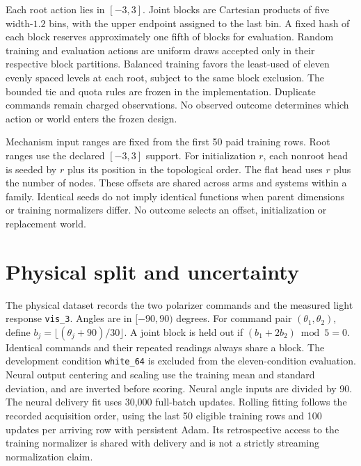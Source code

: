 Each root action lies in $[-3,3]$. Joint blocks are Cartesian products of five
width-$1.2$ bins, with the upper endpoint assigned to the last bin. A fixed hash
of each block reserves approximately one fifth of blocks for evaluation.
Random training and evaluation actions are uniform draws accepted only in
their respective block partitions. Balanced training favors the least-used
of eleven evenly spaced levels at each root, subject to the same block
exclusion. The bounded tie and quota rules are frozen in the implementation.
Duplicate commands remain charged observations. No observed outcome determines
which action or world enters the frozen design.

Mechanism input ranges are fixed from the first 50 paid training rows.
Root ranges use the declared $[-3,3]$ support. For initialization $r$, each
nonroot head is seeded by $r$ plus its position in the topological order. The
flat head uses $r$ plus the number of nodes. These offsets are shared across arms and systems within a family.
Identical seeds do not imply identical functions when parent dimensions or
training normalizers differ. No outcome selects an offset, initialization or
replacement world.

\section{Physical split and uncertainty}
\label{app:physical}
The physical dataset records the two polarizer commands and the measured light response
\texttt{vis\_3}. Angles are in $[-90,90)$ degrees. For command pair
$(\theta_1,\theta_2)$, define $b_j=\lfloor(\theta_j+90)/30\rfloor$.
A joint block is held out if $(b_1+2b_2)\bmod5=0$. Identical commands and their
repeated readings always share a block. The development condition
\texttt{white\_64} is excluded from the eleven-condition evaluation.
Neural output centering and scaling use the training mean and standard
deviation, and are inverted before scoring. Neural angle inputs are divided by
90. The neural delivery fit uses
30,000 full-batch updates. Rolling fitting follows the recorded acquisition order, using the
last 50 eligible training rows and 100 updates per arriving row with persistent
Adam. Its retrospective access to the training normalizer is shared with
delivery and is not a strictly streaming normalization claim.

